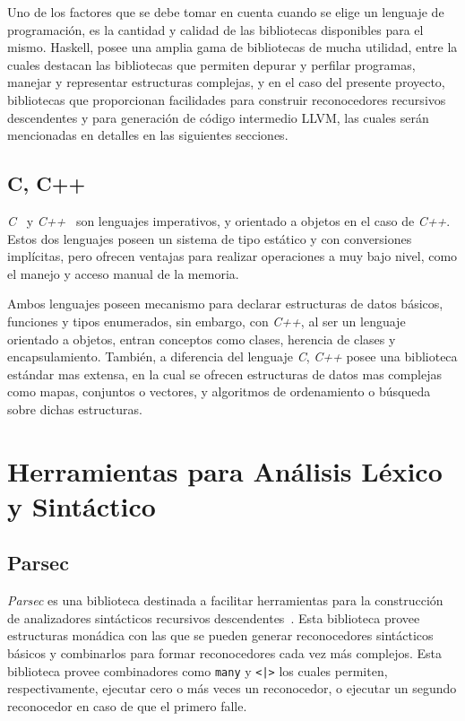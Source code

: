 Uno de los factores que se debe tomar en cuenta cuando se elige un lenguaje de
programación, es la cantidad y calidad de las bibliotecas disponibles para el
mismo. Haskell, posee una amplia gama de bibliotecas de mucha utilidad, entre la
cuales destacan las bibliotecas que permiten depurar y perfilar programas,
manejar y representar estructuras complejas, y en el caso del presente
proyecto, bibliotecas que proporcionan facilidades para construir reconocedores
recursivos descendentes y para generación de código intermedio LLVM, las
cuales serán mencionadas en detalles en las siguientes secciones.


\subsection{C, C++}

\textit{C}~\cite{c-lang} y \textit{C++}~\cite{cpp-lang} son lenguajes
imperativos, y orientado a objetos en el caso de \textit{C++}. Estos dos
lenguajes poseen un sistema de tipo estático y con conversiones implícitas, pero
ofrecen ventajas para realizar operaciones a muy bajo nivel, como el manejo y
acceso manual de la memoria.

Ambos lenguajes poseen mecanismo para declarar estructuras de datos básicos,
funciones y tipos enumerados, sin embargo, con \textit{C++}, al ser un lenguaje
orientado a objetos, entran conceptos como clases, herencia de clases y
encapsulamiento. También, a diferencia del lenguaje \textit{C}, \textit{C++}
posee una biblioteca estándar mas extensa, en la cual se ofrecen estructuras de
datos mas complejas como mapas, conjuntos o vectores, y algoritmos de
ordenamiento o búsqueda sobre dichas estructuras.

\section{Herramientas para Análisis Léxico y Sintáctico}

\subsection{Parsec}

\textit{Parsec} es una biblioteca destinada a facilitar herramientas para la
construcción de analizadores sintácticos recursivos descendentes~\cite{parsec}.
Esta biblioteca provee estructuras monádica con las que se pueden generar
reconocedores sintácticos básicos y combinarlos para formar reconocedores cada
vez más complejos.  Esta biblioteca provee combinadores como \texttt{many} y
\texttt{<|>} los cuales permiten, respectivamente, ejecutar cero o más veces un
reconocedor, o ejecutar un segundo reconocedor en caso de que el primero falle.


